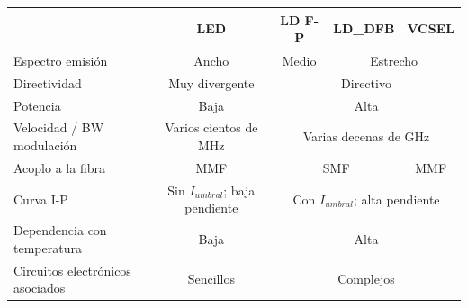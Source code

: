 \begin{itemize}
\begin{itemize}
  		
  		\begin{table}[H]
  			\begin{tabular}{l|c|c|c|c|}
  				\cline{2-5}
  				& \cellcolor[HTML]{EFEFEF}\textbf{LED} & \cellcolor[HTML]{EFEFEF}\textbf{LD F-P} & \cellcolor[HTML]{EFEFEF}\textbf{LD\_DFB} & \cellcolor[HTML]{EFEFEF}\textbf{VCSEL} \\ \hline
  				\multicolumn{1}{|l|}{\cellcolor[HTML]{EFEFEF}Espectro emisión}                 & Ancho                                & Medio                                   & \multicolumn{2}{c|}{Estrecho}                                                     \\ \hline
  				\multicolumn{1}{|l|}{\cellcolor[HTML]{EFEFEF}Directividad}                     & Muy divergente                       & \multicolumn{3}{c|}{Directivo}                                                                                              \\ \hline
  				\multicolumn{1}{|l|}{\cellcolor[HTML]{EFEFEF}Potencia}                         & Baja                                 & \multicolumn{3}{c|}{Alta}                                                                                                   \\ \hline
  				\multicolumn{1}{|l|}{\cellcolor[HTML]{EFEFEF}Velocidad / BW modulación}        & Varios cientos de MHz                & \multicolumn{3}{c|}{Varias decenas de GHz}                                                                                  \\ \hline
  				\multicolumn{1}{|l|}{\cellcolor[HTML]{EFEFEF}Acoplo a la fibra}                & MMF                                  & \multicolumn{2}{c|}{SMF}                                                           & MMF                                    \\ \hline
  				\multicolumn{1}{|l|}{\cellcolor[HTML]{EFEFEF}Curva I-P}                        & Sin $I_{umbral}$; baja pendiente          & \multicolumn{3}{c|}{Con $I_{umbral}$; alta pendiente}                                                                            \\ \hline
  				\multicolumn{1}{|l|}{\cellcolor[HTML]{EFEFEF}Dependencia con temperatura}      & Baja                                 & \multicolumn{3}{c|}{Alta}                                                                                                   \\ \hline
  				\multicolumn{1}{|l|}{\cellcolor[HTML]{EFEFEF}Circuitos electrónicos asociados} & Sencillos                            & \multicolumn{3}{c|}{Complejos}                                                                                              \\ \hline

\end{tabular}
\end{table}
\end{itemize}
\end{itemize}
